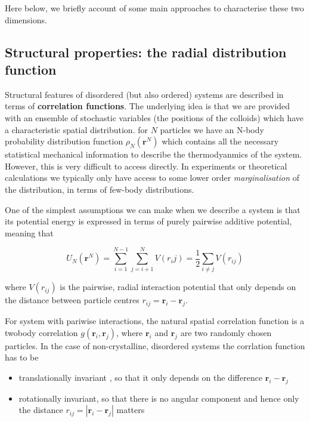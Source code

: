 \documentclass[
  letterpaper,
  enabledeprecatedfontcommands]{report}
\providecommand{\tightlist}{%
  \setlength{\itemsep}{0pt}\setlength{\parskip}{0pt}}
\begin{document}
Here below, we briefly account of some main approaches to characterise
these two dimensions.

\subsection{Structural properties: the radial distribution
function}\label{structural-properties-the-radial-distribution-function}

Structural features of disordered (but also ordered) systems are
described in terms of \textbf{correlation functions}. The underlying
idea is that we are provided with an ensemble of stochastic variables
(the positions of the colloids) which have a characteristic spatial
distribution. for \(N\) particles we have an N-body probability
distribution function \(\rho_N(\mathbf{r}^N)\) which contains all the
necessary statistical mechanical information to describe the
thermodyanmics of the system. However, this is very difficult to access
directly. In experiments or theoretical calculations we typically only
have access to some lower order \emph{marginalisation} of the
distribution, in terms of few-body distributions.

One of the simplest assumptions we can make when we describe a system is
that its potential energy is expressed in terms of purely pairwise
additive potential, meaning that

\[ U_N (\mathbf{r}^N)=\sum_{i=1}^{N-1}\sum_{j=i+1}^N V(r_ij) = \dfrac{1}{2}\sum_{i\neq j}V(r_{ij})\]

where \(V(r_{ij})\) is the pairwise, radial interaction potential that
only depends on the distance between particle centres
\(r_{ij} = \mathbf{r}_i-\mathbf{r}_j\).

For system with pariwise interactions, the natural spatial correlation
function is a twobody correlation \(g(\mathbf{r}_i, \mathbf{r}_j)\),
where \(\mathbf{r}_i\) and \(\mathbf{r}_j\) are two randomly chosen
particles. In the case of non-crystalline, disordered systems the
corrlation function has to be

\begin{itemize}
\tightlist
\item
  translationally invariant , so that it only depends on the difference
  \(\mathbf{r}_i-\mathbf{r}_j\)
\item
  rotationally invariant, so that there is no angular component and
  hence only the distance \(r_{ij} =| \mathbf{r}_i-\mathbf{r}_j|\)
  matters
\end{itemize}
\end{document}
